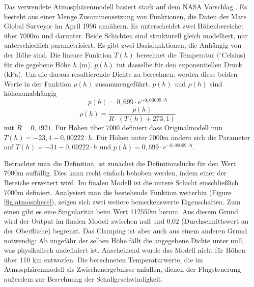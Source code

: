 Das verwendete Atmosphärenmodell basiert stark auf dem NASA Vorschlag \cite{Hall2015}. Es besteht aus einer Menge Zusammensetzung von Funktionen, die Daten der Mars Global Surveyor im April 1996 annähern. Es unterscheidet zwei Höhenbereiche: über 7000m und darunter. Beide Schichten sind strukturell gleich modelliert, nur unterschiedlich parametrisiert. Es gibt zwei Basisfunktionen, die Anhängig von der Höhe sind. Die lineare Funktion $T(h)$ berechnet die Temperatur ($^{\circ}$Celsius) für die gegebene Höhe $h$ (m). $p(h)$ tut dasselbe für den exponentiellen Druck (kPa). Um die daraus resultierende Dichte zu berechnen, werden diese beiden Werte in der Funktion $\rho(h)$ zusammengeführt. $p(h)$ und $\rho(h)$ sind höhenunabhängig
$$ p(h) = 0,699 \cdot e^{-0,00009 \cdot h}$$
$$ \rho(h) =  \frac{p(h)}{R \cdot (T(h) + 273,1)} $$
mit $ R = 0,1921 $. Für Höhen über 7000 definiert dass Originalmodell nun $ T(h) = -23,4 - 0,00222 \cdot h $. Für Höhen unter 7000m ändern sich die Parameter auf $ T(h) = -31 - 0,00222 \cdot h $ und $ p(h) = 0,699 \cdot e^{-0,00009 \cdot h}$.

Betrachtet man die Definition, ist zunächst die Definitionslücke für den Wert 7000m auffällig. Dies kann recht einfach behoben werden, indem einer der Bereiche erweitert wird. Im finalen Modell ist die untere Schicht einschließlich 7000m definiert. Analysiert man die bestehende Funktion weiterhin (Figure \ref{fig:atmosphere}), zeigen sich zwei weitere bemerkenswerte Eigenschaften.
Zum einen gibt es eine Singularität beim Wert 112550m herum. Aus diesem Grund wird der Output im finalen Modell zwischen null und 0,02 (Durchschnittswert an der Oberfläche)\cite{NASA2016} begrenzt. Das Clamping ist aber auch aus einem anderen Grund notwendig: Ab ungefähr der selben Höhe fällt die angegebene Dichte unter null, was physikalisch undefiniert ist. Anscheinend wurde das Modell nicht für Höhen über 110 km entworfen. Die berechneten Temperaturwerte, die im Atmosphärenmodell als Zwischenergebnisse anfallen, dienen der Flugsteuerung außerdem zur Berechnung der Schallgeschwindigkeit.